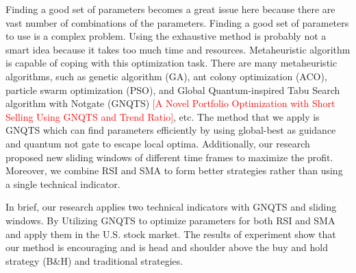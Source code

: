 \documentclass[../main.tex]{subfiles}
\begin{document}
\bigbreak

Finding a good set of parameters becomes a great issue here because there are vast number of combinations of the parameters. Finding a good set of parameters to use is a complex problem. Using the exhaustive method is probably not a smart idea because it takes too much time and resources. Metaheuristic algorithm is capable of coping with this optimization task. There are many metaheuristic algorithms, such as genetic algorithm (GA), ant colony optimization (ACO), particle swarm optimization (PSO), and Global Quantum-inspired Tabu Search algorithm with Notgate (GNQTS) \textcolor{red}{[A Novel Portfolio Optimization with Short Selling Using GNQTS and Trend Ratio]}, etc. The method that we apply is GNQTS which can find parameters efficiently by using global-best as guidance and quantum not gate to escape local optima. Additionally, our research proposed new sliding windows of different time frames to maximize the profit. Moreover, we combine RSI and SMA to form better strategies rather than using a single technical indicator.

\bigbreak

In brief, our research applies two technical indicators with GNQTS and sliding windows. By Utilizing GNQTS to optimize parameters for both RSI and SMA and apply them in the U.S. stock market. The results of experiment show that our method is encouraging and is head and shoulder above the buy and hold strategy (B\&H) and traditional strategies.
\end{document}
